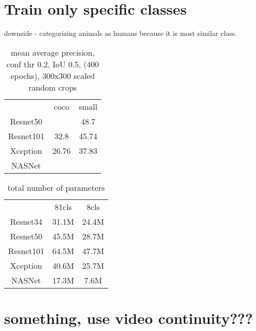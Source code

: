 \section{Train only specific classes}
downside - categorizing animals as humans because it is most similar class.
\begin{table}
    \begin{tabular}{c|c|c}
         & coco & small \\
        Resnet50 & & 48.7\\
        Resnet101 & 32.8 & 45.74\\
        Xception & 26.76 & 37.83\\
        NASNet & & \\
    \end{tabular}
    \caption{mean average precision, conf thr 0.2, IoU 0.5,  (400 epochs), 300x300 scaled random crops}
    \label{tab:map}
\end{table}


\begin{table}
    \begin{tabular}{c|c|c}
     & 81cls & 8cls  \\
    Resnet34 & 31.1M & 24.4M\\
    Resnet50 & 45.5M & 28.7M\\
    Resnet101 & 64.5M & 47.7M \\
    Xception & 40.6M & 25.7M \\
    NASNet & 17.3M & 7.6M \\
    \end{tabular}
    \caption{total number of parameters}
    \label{tab:parameters}
\end{table}



\section{something, use video continuity???}